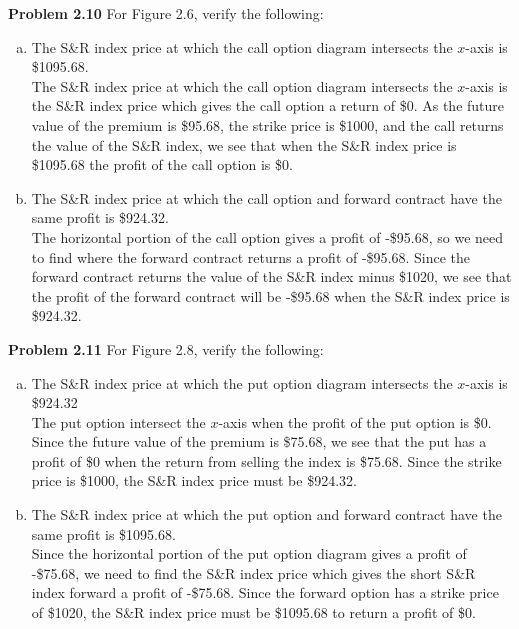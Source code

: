 \documentclass[12pt]{article}
\newcommand{\problem}[1]{\bigskip \noindent \textbf{Problem #1}}
\theoremstyle{plain}
\begin{document}
\problem{2.10} For Figure 2.6, verify the following:
\begin{enumerate}[(a)]
\item The S\&R index price at which the call option diagram intersects the $x$-axis is \$1095.68.\\

The S\&R index price at which the call option diagram intersects the $x$-axis is the S\&R index price which gives the call option a return of \$0. As the future value of the premium is \$95.68, the strike price is \$1000, and the call returns the value of the S\&R index, we see that when the S\&R index price is \$1095.68 the profit of the call option is \$0.

\item The S\&R index price at which the call option and forward contract have the same profit is \$924.32.\\

The horizontal portion of the call option gives a profit of -\$95.68, so we need to find where the forward contract returns a profit of -\$95.68. Since the forward contract returns the value of the S\&R index minus \$1020, we see that the profit of the forward contract will be -\$95.68 when the S\&R index price is \$924.32.

\end{enumerate}

\problem{2.11} For Figure 2.8, verify the following:
\begin{enumerate}[(a)]
\item The S\&R index price at which the put option diagram intersects the $x$-axis is \$924.32\\

The put option intersect the $x$-axis when the profit of the put option is \$0. Since the future value of the premium is \$75.68, we see that the put has a profit of \$0 when the return from selling the index is \$75.68. Since the strike price is \$1000, the S\&R index price must be \$924.32.

\item The S\&R index price at which the put option and forward contract have the same profit is \$1095.68.\\

Since the horizontal portion of the put option diagram gives a profit of -\$75.68, we need to find the S\&R index price which gives the short S\&R index forward a profit of -\$75.68. Since the forward option has a strike price of \$1020, the S\&R index price must be \$1095.68 to return a profit of \$0.
\end{enumerate}
\end{document}
